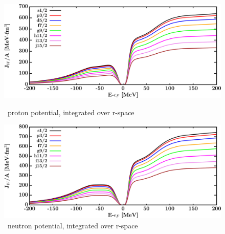 \begin{figure}[H]
    \centering
    \begin{minipage}{0.45\textwidth}
        \centering
        \includegraphics[width=1.0\textwidth]{figures/ni58_protonVolumeIntegrals.png}
        \caption{\niEight\ proton potential, integrated over r-space}
        \label{DOMFitData_ni58_proton_potentialIntegral}
    \end{minipage}\hfill
    \begin{minipage}{0.45\textwidth}
        \centering
        \includegraphics[width=1.0\textwidth]{figures/ni58_neutronVolumeIntegrals.png}
        \caption{\niEight\ neutron potential, integrated over r-space}
        \label{DOMFitData_ni58_neutron_potentialIntegral}
    \end{minipage}
\end{figure}

\afterpage{\clearpage}

